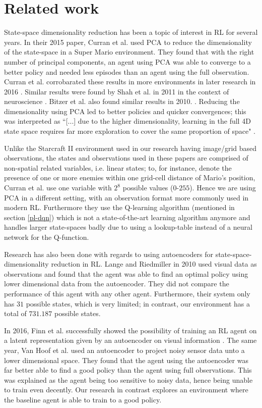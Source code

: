\chapter{Related work}\label{relatedwork}
State-space dimensionality reduction has been a topic of interest in RL for several years. In their 2015 paper, Curran et al. \cite{mario} used PCA to reduce the dimensionality of the state-space in a Super Mario environment. They found that with the right number of principal components, an agent using PCA was able to converge to a better policy and needed less episodes than an agent using the full observation. Curran et al. corrobarated these results in more environments in later research in 2016 \cite{pca_curran}. Similar results were found by Shah et al. in 2011 in the context of neuroscience \cite{pca_neural}. Bitzer et al. also found similar results in 2010. \cite{pca_bitzer}. Reducing the dimensionality using PCA led to better policies and quicker convergences; this was interpreted as ``[...] due to the higher dimensionality, learning in the full 4D state space requires far more exploration to cover the same proportion of space" \cite{pca_bitzer}.

Unlike the Starcraft II environment used in our research having image/grid based observations, the states and observations used in these papers are comprised of non-spatial related variables, i.e. linear states; to, for instance, denote the presence of one or more enemies within one grid-cell distance of Mario's position, Curran et al. use one variable with $2^8$ possible values ($0$-$255$). Hence we are using PCA in a different setting, with an observation format more commonly used in modern RL. Furthermore they use the Q-learning algorithm (mentioned in section \ref{pl-dqn}) which is not a state-of-the-art learning algorithm anymore and handles larger state-spaces badly due to using a lookup-table instead of a neural network for the Q-function.

Research has also been done with regards to using autoencoders for state-space-dimensionality reduction in RL. Lange and Riedmiller in 2010 \cite{AE_2010} used visual data as observations and found that the agent was able to find an optimal policy using lower dimensional data from the autoencoder. They did not compare the performance of this agent with any other agent. Furthermore, their system only has $31$ possible states, which is very limited; in contrast, our environment has a total of $731.187$ possible states. 

In 2016, Finn et al. successfully showed the possibility of training an RL agent on a latent representation given by an autoencoder on visual information \cite{ae_visual}. The same year, Van Hoof et al. \cite{AE_2016} used an autoencoder to project noisy sensor data unto a lower dimensional space. They found that the agent using the autoencoder was far better able to find a good policy than the agent using full observations. This was explained as the agent being too sensitive to noisy data, hence being unable to train even decently. Our research in contrast explores an environment where the baseline agent is able to train to a good policy.

